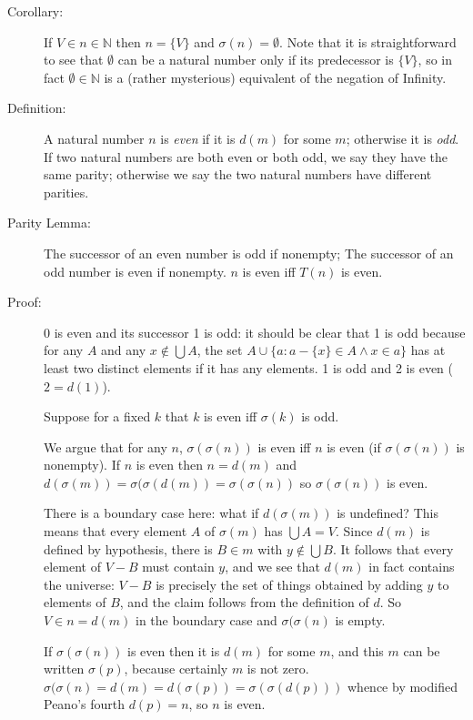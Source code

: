 \documentclass[12pt]{article}
\begin{document}
\begin{description}
\item[Corollary:]  If $V\in n \in \mathbb N$ then $n=\{V\}$ and $\sigma(n)=\emptyset$.  Note that it is straightforward to see that $\emptyset$ can be a natural number only if its predecessor is $\{V\}$, so in 
fact $\emptyset \in \mathbb N$ is a (rather mysterious) equivalent of the negation of Infinity.

\item[Definition:]  A natural number $n$ is {\em even\/} if it is $d(m)$ for some $m$;  otherwise it is {\em odd\/}.   If two natural numbers are both even or both odd, we say they have the same parity;  otherwise we say the two natural numbers have different parities.

\item[Parity Lemma:]  The successor of an even number is odd if nonempty;  The successor of an odd number is even if nonempty.  $n$ is even iff $T(n)$ is even.

\item[Proof:] 0 is even and its successor 1 is odd:  it should be clear that 1 is odd because for any $A$ and any $x \not\in \bigcup A$, the set $A \cup \{a:a-\{x\} \in A \wedge x\in a\}$ has at least two distinct elements if it has any elements.
1 is odd and 2 is even ($2=d(1)$).

Suppose for a fixed $k$ that $k$ is even iff $\sigma(k)$ is odd.

We argue that for any $n$, $\sigma(\sigma(n))$ is even iff $n$ is even (if $\sigma(\sigma(n))$ is nonempty).  If $n$ is even then $n=d(m)$ and $d(\sigma(m))=\sigma(\sigma(d(m))=\sigma(\sigma(n))$ so $\sigma(\sigma(n))$ is even.

There is a boundary case here:  what if $d(\sigma(m))$ is undefined?  This means that every element $A$ of $\sigma(m)$ has $\bigcup A=V$.  Since $d(m)$ is defined by hypothesis, there is $B \in m$ with
$y \not\in \bigcup B$.  It follows that every element of $V-B$ must contain $y$, and we see that $d(m)$ in fact contains the universe:  $V-B$ is precisely the set of things obtained by adding $y$ to elements of $B$, and the claim follows from the definition of $d$.  So $V \in n = d(m)$ in the boundary case and $\sigma(\sigma(n)$ is empty.

  If $\sigma(\sigma(n))$ is even
then it is $d(m)$ for some $m$, and this $m$ can be written $\sigma(p)$, because certainly $m$ is not zero.  $\sigma(\sigma(n)=d(m)=d(\sigma(p))=\sigma(\sigma(d(p)))$ whence by modified Peano's fourth $d(p)=n$, so $n$ is even.


\end{description}
\end{document}
